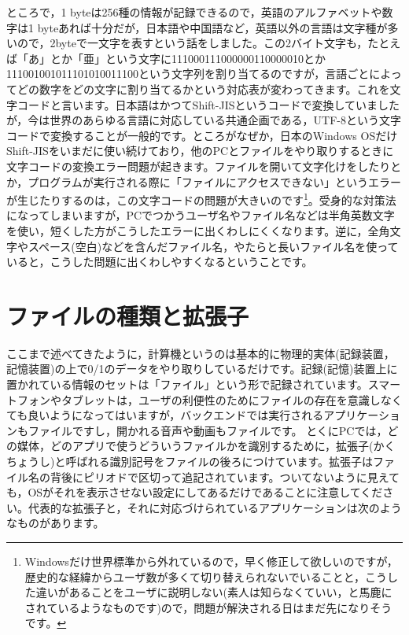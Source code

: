 \documentclass{ltjsbook}
\begin{document}
ところで，1 byteは256種の情報が記録できるので，英語のアルファベットや数字は1 byteあれば十分だが，日本語や中国語など，英語以外の言語は文字種が多いので，2byteで一文字を表すという話をしました。この2バイト文字も，たとえば「あ」とか「亜」という文字に111000111000000110000010とか111001001011101010011100という文字列を割り当てるのですが，言語ごとによってどの数字をどの文字に割り当てるかという対応表が変わってきます。これを文字コードと言います。日本語はかつてShift-JISというコードで変換していましたが，今は世界のあらゆる言語に対応している共通企画である，UTF-8という文字コードで変換することが一般的です。ところがなぜか，日本のWindows OSだけShift-JISをいまだに使い続けており，他のPCとファイルをやり取りするときに文字コードの変換エラー問題が起きます。ファイルを開いて文字化けをしたりとか，プログラムが実行される際に「ファイルにアクセスできない」というエラーが生じたりするのは，この文字コードの問題が大きいのです\footnote{Windowsだけ世界標準から外れているので，早く修正して欲しいのですが，歴史的な経緯からユーザ数が多くて切り替えられないでいることと，こうした違いがあることをユーザに説明しない(素人は知らなくていい，と馬鹿にされているようなものです)ので，問題が解決される日はまだ先になりそうです。}。受身的な対策法になってしまいますが，PCでつかうユーザ名やファイル名などは半角英数文字を使い，短くした方がこうしたエラーに出くわしにくくなります。逆に，全角文字やスペース(空白)などを含んだファイル名，やたらと長いファイル名を使っていると，こうした問題に出くわしやすくなるということです。


\section{ファイルの種類と拡張子}
\label{suffix}
ここまで述べてきたように，計算機というのは基本的に物理的実体(記録装置，記憶装置)の上で0/1のデータをやり取りしているだけです。記録(記憶)装置上に置かれている情報のセットは「ファイル」という形で記録されています。スマートフォンやタブレットは，ユーザの利便性のためにファイルの存在を意識しなくても良いようになってはいますが，バックエンドでは実行されるアプリケーションもファイルですし，開かれる音声や動画もファイルです。
とくにPCでは，どの媒体，どのアプリで使うどういうファイルかを識別するために，拡張子(かくちょうし)と呼ばれる識別記号をファイルの後ろにつけています。拡張子はファイル名の背後にピリオドで区切って追記されています。ついてないように見えても，OSがそれを表示させない設定にしてあるだけであることに注意してください。代表的な拡張子と，それに対応づけられているアプリケーションは次のようなものがあります。
\end{document}
